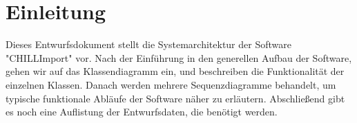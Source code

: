 \section{Einleitung}

Dieses Entwurfsdokument stellt die Systemarchitektur der Software "{CHILLImport}"{ vor}.
Nach der Einführung in den generellen Aufbau der Software, gehen wir auf das Klassendiagramm ein, und beschreiben die Funktionalität der einzelnen Klassen.
Danach werden mehrere Sequenzdiagramme behandelt, um typische funktionale Abläufe der Software näher zu erläutern.
Abschließend gibt es noch eine Auflistung der Entwurfsdaten, die benötigt werden.
